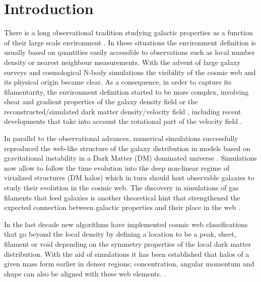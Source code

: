 \documentclass[useAMS,usenatbib]{mn2e}
\begin{document}
\section{Introduction}
\label{sec:introduction}

There is a long observational tradition studying galactic properties
as a function of their large scale environment
\citep[e.g.][]{Oemler1974,Dressler1980,Pimbblet2002,Gomez2003,Kauffmann2004,Abbas2006,Baldry2006,Park2007,OMill2008,Gonzalez2009,Padilla2010,Wilman2010,Muldrew2012}. In these situations the environment definition is usually based on
quantities easily accessible to observations such as local number
density or nearest neighbour measurements. With
the advent of large galaxy surveys and cosmological N-body simulations
the visibility of the cosmic web and its physical origin became
clear. As a consequence, in order to capture its filamentarity, the
environment definition started to be more complex, involving shear and gradient properties of the galaxy density field or the reconstructed/simulated dark
matter density/velocity field
\citep[e.g.][]{Lee2005,Basilakos2006,AragonCalvo2007,Hahn2007,Sousbie2008,Zhang2009,Tweb,MunozCuartas2011,Vweb,Trowland2013,Tempel2014},
including recent developments that take into account the rotational
part of the velocity field \citep[e.g.][]{Wang2013,LibeskindVorticity}.

In parallel to the observational advances, numerical simulations
successfully reproduced the web-like structure of the galaxy
distribution in models based on gravitational instability in a Dark
Matter (DM) dominated universe
\citep[e.g.][]{Bond1996,Colberg2005}. Simulations now allow to follow
the time evolution into the deep non-linear regime of virialized
structures (DM halos) which in turn should host observable
galaxies to study their evolution in the cosmic web. The discovery in
simulations of gas filaments that feed galaxies is another theoretical
hint that strengthened the expected connection between galactic
properties and their place in the web \citep{Ocvirk2008,Dekel2009}.  

In the last decade new algorithms have implemented cosmic web
classifications that go beyond the local density by defining a
location to be a peak, sheet, filament or void depending on the
symmetry properties of the local dark matter distribution. With the
aid of simulations it has been established that halos of a given mass
form earlier in denser regions; concentration, angular momentum and
shape can also be aligned with these web
elements. \citep[e.g][]{AragonCalvo2007,Hahn2007,Zhang2009,Gonzalez2010,Noh2011,Codis2012,Libeskind2013,Trowland2013}.     
\end{document}
